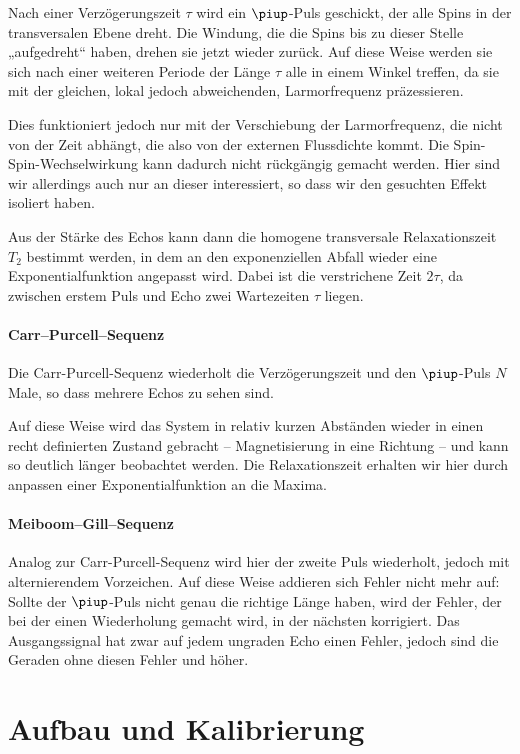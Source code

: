 Nach einer Verzögerungszeit $\tau$ wird ein $\piup$-Puls geschickt, der alle
Spins in der transversalen Ebene dreht. Die Windung, die die Spins bis zu
dieser Stelle „aufgedreht“ haben, drehen sie jetzt wieder zurück. Auf diese
Weise werden sie sich nach einer weiteren Periode der Länge $\tau$ alle in
einem Winkel treffen, da sie mit der gleichen, lokal jedoch abweichenden,
Larmorfrequenz präzessieren.

Dies funktioniert jedoch nur mit der Verschiebung der Larmorfrequenz, die nicht
von der Zeit abhängt, die also von der externen Flussdichte kommt. Die
Spin-Spin-Wechselwirkung kann dadurch nicht rückgängig gemacht werden. Hier
sind wir allerdings auch nur an dieser interessiert, so dass wir den gesuchten
Effekt isoliert haben.

Aus der Stärke des Echos kann dann die homogene transversale Relaxationszeit
$T_2$ bestimmt werden, in dem an den exponenziellen Abfall wieder eine
Exponentialfunktion angepasst wird. Dabei ist die verstrichene Zeit $2 \tau$,
da zwischen erstem Puls und Echo zwei Wartezeiten $\tau$ liegen.

\subsubsection{Carr–Purcell–Sequenz}

Die Carr-Purcell-Sequenz wiederholt die Verzögerungszeit und den $\piup$-Puls
$N$ Male, so dass mehrere Echos zu sehen sind.

Auf diese Weise wird das System in relativ kurzen Abständen wieder in einen
recht definierten Zustand gebracht – Magnetisierung in eine Richtung – und kann
so deutlich länger beobachtet werden. Die Relaxationszeit erhalten wir hier
durch anpassen einer Exponentialfunktion an die Maxima.

\subsubsection{Meiboom–Gill–Sequenz}

Analog zur Carr-Purcell-Sequenz wird hier der zweite Puls wiederholt, jedoch
mit alternierendem Vorzeichen. Auf diese Weise addieren sich Fehler nicht mehr
auf: Sollte der $\piup$-Puls nicht genau die richtige Länge haben, wird der
Fehler, der bei der einen Wiederholung gemacht wird, in der nächsten
korrigiert. Das Ausgangssignal hat zwar auf jedem ungraden Echo einen Fehler,
jedoch sind die Geraden ohne diesen Fehler und höher.

\chapter{Aufbau und Kalibrierung}
